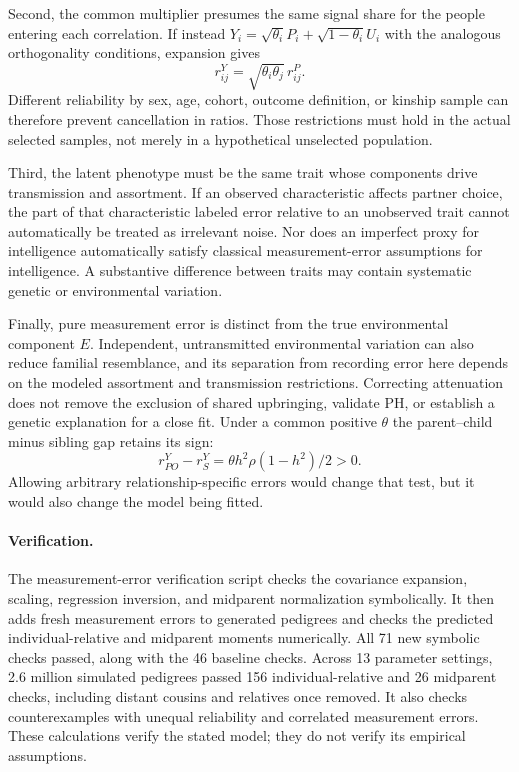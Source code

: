 Second, the common multiplier presumes the same signal share for the
people entering each correlation. If instead
$Y_i=\sqrt{\theta_i}P_i+\sqrt{1-\theta_i}U_i$ with the analogous
orthogonality conditions, expansion gives
\[
 r^Y_{ij}=\sqrt{\theta_i\theta_j}\,r^P_{ij}.
\]
Different reliability by sex, age, cohort, outcome definition, or kinship
sample can therefore prevent cancellation in ratios. Those restrictions
must hold in the actual selected samples, not merely in a hypothetical
unselected population.

Third, the latent phenotype must be the same trait whose components
drive transmission and assortment. If an observed characteristic
affects partner choice, the part of that characteristic labeled error
relative to an unobserved trait cannot automatically be treated as
irrelevant noise. Nor does an imperfect proxy for intelligence
automatically satisfy classical measurement-error assumptions for
intelligence. A substantive difference between traits may contain
systematic genetic or environmental variation.

Finally, pure measurement error is distinct from the true environmental
component $E$. Independent, untransmitted environmental variation can
also reduce familial resemblance, and its separation from recording
error here depends on the modeled assortment and transmission
restrictions. Correcting attenuation does not remove the exclusion
of shared upbringing, validate PH, or establish a genetic explanation
for a close fit. Under a common positive $\theta$ the parent--child
minus sibling gap retains its sign:
\[
 r^Y_{PO}-r^Y_S
 =\theta h^2\rho(1-h^2)/2>0.
\]
Allowing arbitrary relationship-specific errors would change that test,
but it would also change the model being fitted.

\paragraph{Verification.}
The measurement-error verification script checks the covariance
expansion, scaling, regression inversion, and midparent normalization
symbolically. It then adds fresh measurement errors to generated
pedigrees and checks the predicted individual-relative and midparent
moments numerically. All 71 new symbolic checks passed, along with the 46 baseline checks. Across 13 parameter settings, 2.6 million simulated pedigrees passed 156 individual-relative and 26 midparent checks, including distant cousins and relatives once removed. It also checks counterexamples with unequal
reliability and correlated measurement errors. These calculations
verify the stated model; they do not verify its empirical assumptions.
